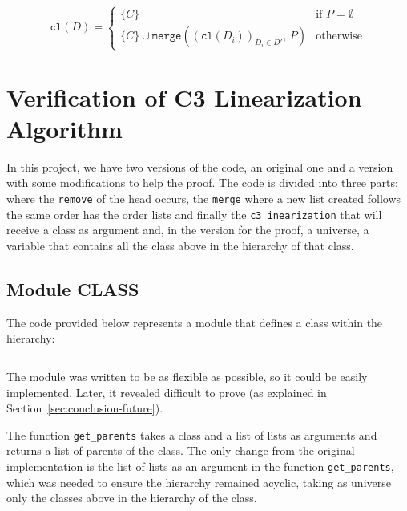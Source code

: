 \documentclass[runningheads]{llncs}
\newcommand*{\mer}{\texttt{merge}}
\begin{document}
\[
\texttt{cl}(D) =
\begin{cases}
\{C\} & \text{if } P = \emptyset \\
\{C\} \cup \mer\left( \left( \texttt{cl}(D_i) \right)_{D_i \in D'},\, P \right) & \text{otherwise}
\end{cases}
\]

\section{Verification of C3 Linearization Algorithm}
\label{sec:VerificationC3}

In this project, we have two versions of the code, an original one and a version with some modifications to help the proof. The code is divided into three parts: where the \texttt{remove} of the head occurs, 
 the \texttt{merge} where a new list created follows the same order has the order lists and finally the \texttt{c3\_inearization} that will receive a class as argument and,
  in the version for the proof, a universe, a variable that contains all the class above in the hierarchy of that class.

\subsection{Module CLASS}
\label{subsec:CLASS}

The code provided below represents a module that defines a class within the hierarchy:
\inputminted[firstline=4,lastline=22,fontsize=\small,linenos,xleftmargin=20pt]{ocaml}{../c3/cameleer/c3.ml} 
The module was written to be as flexible as possible, so it could be easily implemented.
Later, it revealed difficult to prove (as explained in Section~\ref{sec:conclusion-future}).

The function \texttt{get\_parents} takes a class and a list of lists as arguments and returns a list of parents of the class.
The only change from the original implementation is the list of lists as an argument in the function 
\texttt{get\_parents}, which was needed to ensure the hierarchy remained acyclic,
 taking as universe only the classes above in the hierarchy of the class.
\end{document}
